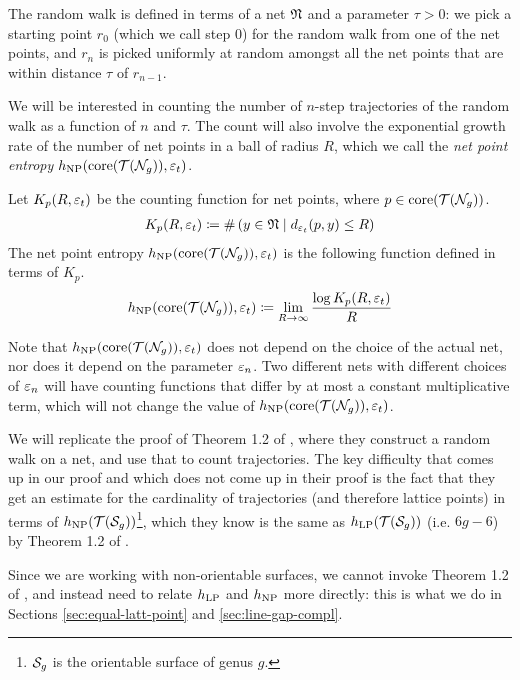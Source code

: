 The random walk is defined in terms of a net $\mathfrak{N}$ and a parameter $\tau > 0$: we pick a starting point $r_0$ (which we call step $0$) for the random walk from one of the net points, and $r_n$ is picked uniformly at random amongst all the net points that are within distance $\tau$ of $r_{n-1}$.

We will be interested in counting the number of $n$-step trajectories of the random walk as a function of $n$ and $\tau$.
The count will also involve the exponential growth rate of the number of net points in a ball of radius $R$, which we call the \emph{net point entropy} $h_{\mathrm{NP}}(\mathrm{core}(\mathcal{T}(\mathcal{N}_g)), \varepsilon_t)$.

\begin{definition}
  Let $K_p(R, \varepsilon_t)$ be the counting function for net points, where $p \in \mathrm{core}(\mathcal{T}(\mathcal{N}_g))$.
  \begin{align*}
    K_p(R, \varepsilon_t) \coloneqq \#\left( y \in \mathfrak{N} \mid d_{\varepsilon_t}(p, y) \leq R \right)
  \end{align*}
  The net point entropy $h_{\mathrm{NP}}(\mathrm{core}(\mathcal{T}(\mathcal{N}_g)), \varepsilon_t)$ is the following function defined in terms of $K_p$.
  \begin{align*}
    h_{\mathrm{NP}}(\mathrm{core}(\mathcal{T}(\mathcal{N}_g)), \varepsilon_t) \coloneqq \lim_{R \to \infty} \frac{\log K_p(R, \varepsilon_t)}{R}
  \end{align*}
\end{definition}

Note that $h_{\mathrm{NP}}(\mathrm{core}(\mathcal{T}(\mathcal{N}_g)), \varepsilon_t)$ does not depend on the choice of the actual net, nor does it depend on the parameter $\varepsilon_n$. Two different nets with different choices of $\varepsilon_n$ will have counting functions that differ by at most a constant multiplicative term, which will not change the value of $h_{\mathrm{NP}}(\mathrm{core}(\mathcal{T}(\mathcal{N}_g)), \varepsilon_t)$.

We will replicate the proof of Theorem 1.2 of \textcite{eskinmirzakhani}, where they construct a random walk on a net, and use that to count \concave trajectories.
The key difficulty that comes up in our proof and which does not come up in their proof is the fact that they get an estimate for the cardinality of \concave trajectories (and therefore \concave lattice points) in terms of $h_{\mathrm{NP}}(\mathcal{T}(\mathcal{S}_g))$\footnote{$\mathcal{S}_g$ is the orientable surface of genus $g$.}, which they know is the same as $h_{\mathrm{LP}}(\mathcal{T}(\mathcal{S}_g))$ (i.e. $6g-6$) by Theorem 1.2 of \textcite{10.1215/00127094-1548443}.

Since we are working with non-orientable surfaces, we cannot invoke Theorem 1.2 of \textcite{10.1215/00127094-1548443}, and instead need to relate $h_{\mathrm{LP}}$ and $h_{\mathrm{NP}}$ more directly: this is what we do in Sections \ref{sec:equal-latt-point} and \ref{sec:line-gap-compl}.

